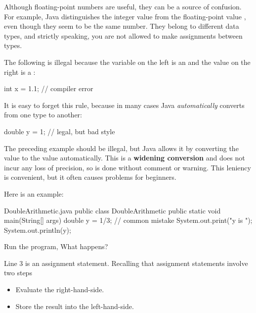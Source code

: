 %

Although floating-point numbers are useful, they can be a source of confusion.
For example, Java distinguishes the integer value  from the floating-point value , even though they seem to be the same number.
They belong to different data types, and strictly speaking, you are not allowed to make assignments between types.

The following is illegal because the variable on the left is an  and the value on the right is a :

\begin{code}
int x = 1.1;  // compiler error
\end{code}

It is easy to forget this rule, because in many cases Java {\em automatically} converts from one type to another:

\begin{code}
double y = 1;  // legal, but bad style
\end{code}

The preceding example should be illegal, but Java allows it by converting the  value  to the  value  automatically.
This is a \textbf{widening conversion} and does not incur any loss of precision, so is done without comment or warning.  This leniency is convenient, but it often causes problems for beginners.

Here is an example:
\begin{trinket}[210]{DoubleArithmetic.java}
public class DoubleArithmetic {
    public static void main(String[] args) {
        double y = 1/3;  // common mistake
        System.out.print("y is ");
        System.out.println(y);
    }
}
\end{trinket}

Run the program,  What happens?

Line 3 is an assignment statement.  Recalling that assignment statements involve two steps

\begin{itemize}
\item Evaluate the right-hand-side.
\item Store the result into the left-hand-side. 
\end{itemize}

